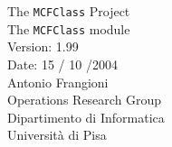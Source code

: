 \documentclass[a4paper]{book}
\begin{document}
\begin{titlepage}
\vspace*{7cm}
\begin{center}
{\Large The {\tt MCFClass} Project}\\
\vspace*{0.5cm}
{\large The {\tt MCFClass} module}\\
{\large Version: 1.99}\\
{\large Date: 15 / 10 /2004}\\
\vspace*{1cm}
{\large Antonio Frangioni}\\
\vspace*{0.5cm}
Operations Research Group\\
Dipartimento di Informatica\\
Universit\`a di Pisa\\
\end{center}
\end{titlepage}
\clearemptydoublepage
{}
\tableofcontents
\clearemptydoublepage
{}
\end{document}

